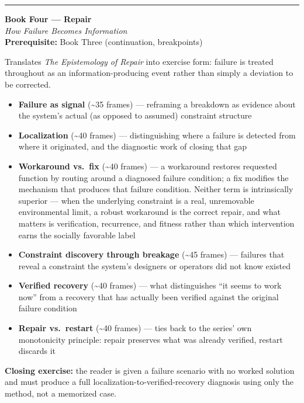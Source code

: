 \documentclass[11pt]{article}
\newenvironment{bookentry}[3]{%
  \par\noindent\rule{\linewidth}{0.5pt}\par\vspace{0.5em}
  {\Large\bfseries #1}\\[0.15em]
  {\itshape\large #2}\\[0.3em]
  {\small\textbf{Prerequisite:} #3}\par\vspace{0.6em}
}{\par\vspace{0.8em}}
\newenvironment{sectionlist}{%
  \begin{itemize}[leftmargin=1.4em, itemsep=0.45em, topsep=0.3em]
}{%
  \end{itemize}
}
\newcommand{\secitem}[3]{\item \textbf{#1} (\textasciitilde#2 frames) --- #3}
\begin{document}
\begin{bookentry}{Book Four --- Repair}{How Failure Becomes Information}{Book Three (continuation, breakpoints)}
Translates \textit{The Epistemology of Repair} into exercise form: failure is treated throughout as an information-producing event rather than simply a deviation to be corrected.

\begin{sectionlist}
\secitem{Failure as signal}{35}{reframing a breakdown as evidence about the system's actual (as opposed to assumed) constraint structure}
\secitem{Localization}{40}{distinguishing where a failure is detected from where it originated, and the diagnostic work of closing that gap}
\secitem{Workaround vs.\ fix}{40}{a workaround restores requested function by routing around a diagnosed failure condition; a fix modifies the mechanism that produces that failure condition. Neither term is intrinsically superior --- when the underlying constraint is a real, unremovable environmental limit, a robust workaround is the correct repair, and what matters is verification, recurrence, and fitness rather than which intervention earns the socially favorable label}
\secitem{Constraint discovery through breakage}{45}{failures that reveal a constraint the system's designers or operators did not know existed}
\secitem{Verified recovery}{40}{what distinguishes ``it seems to work now'' from a recovery that has actually been verified against the original failure condition}
\secitem{Repair vs.\ restart}{40}{ties back to the series' own monotonicity principle: repair preserves what was already verified, restart discards it}
\end{sectionlist}
\textbf{Closing exercise:} the reader is given a failure scenario with no worked solution and must produce a full localization-to-verified-recovery diagnosis using only the method, not a memorized case.
\end{bookentry}
\end{document}
